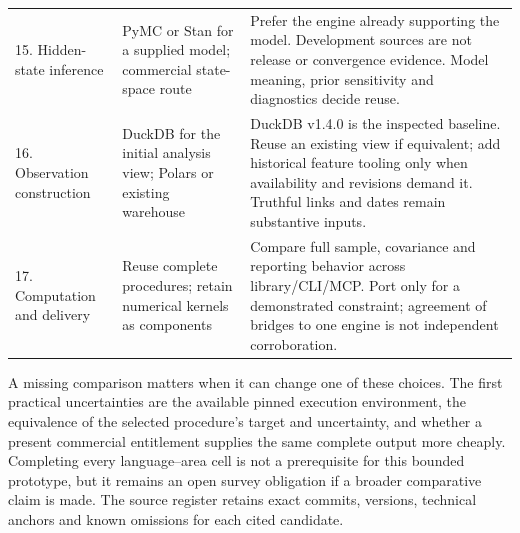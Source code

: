 \begin{longtable}{P{2.2cm}P{4.3cm}P{7.7cm}}
15. Hidden-state inference & PyMC or Stan for a supplied model; commercial state-space route & Prefer the engine already supporting the model. Development sources are not release or convergence evidence. Model meaning, prior sensitivity and diagnostics decide reuse. \citep{exec23_pymc_sources,exec25_bsw_stan,exec22_state_stata_sspace_post}\\[5pt]
16. Observation construction & DuckDB for the initial analysis view; Polars or existing warehouse & DuckDB v1.4.0 is the inspected baseline. Reuse an existing view if equivalent; add historical feature tooling only when availability and revisions demand it. Truthful links and dates remain substantive inputs. \citep{exec19_duckdb_source,exec23_polars_sources,exec19_feast_source}\\[5pt]
17. Computation and delivery & Reuse complete procedures; retain numerical kernels as components & Compare full sample, covariance and reporting behavior across library/CLI/MCP. Port only for a demonstrated constraint; agreement of bridges to one engine is not independent corroboration. \citep{exec25_paneljava_commons,exec25_panelcxx_fixest,exec25_panelother_julia}\\
\bottomrule
\end{longtable}
\endgroup

A missing comparison matters when it can change one of these choices. The
first practical uncertainties are the available pinned execution environment,
the equivalence of the selected procedure's target and uncertainty, and
whether a present commercial entitlement supplies the same complete output
more cheaply. Completing every language--area cell is not a prerequisite
for this bounded prototype, but it remains an open survey obligation if a
broader comparative claim is made. The source register retains exact commits,
versions, technical anchors and known omissions for each cited candidate.
